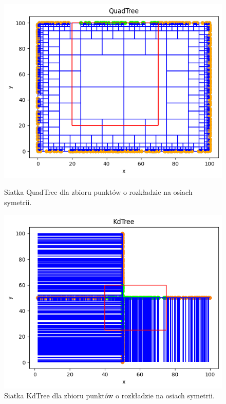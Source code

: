 \documentclass{lab}
\begin{document}
\begin{figure}[H]
  \centering
  \begin{minipage}{0.495\textwidth}
      \centering
      \includegraphics[width=1\textwidth]{resources/cross_QuadTree.png}
      \caption{Siatka QuadTree dla zbioru punktów o rozkładzie na osiach symetrii.}
      \label{fig:cross_QuadTree}
  \end{minipage}
  \begin{minipage}{0.495\textwidth}
      \centering
      \includegraphics[width=1\textwidth]{resources/cross_KdTree.png}
      \caption{Siatka KdTree dla zbioru punktów o rozkładzie na osiach symetrii.}
      \label{fig:cross_KdTree}
  \end{minipage}
\end{figure}
\end{document}
